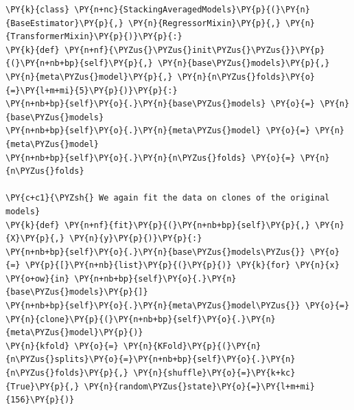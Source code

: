 \documentclass[no-math]{YangThesis}
\begin{document}
\begin{tcolorbox}[breakable, size=fbox, boxrule=1pt, pad at break*=1mm,colback=cellbackground, colframe=cellborder]
	\begin{Verbatim}[commandchars=\\\{\}]
\PY{k}{class} \PY{n+nc}{StackingAveragedModels}\PY{p}{(}\PY{n}{BaseEstimator}\PY{p}{,} \PY{n}{RegressorMixin}\PY{p}{,} \PY{n}{TransformerMixin}\PY{p}{)}\PY{p}{:}
\PY{k}{def} \PY{n+nf}{\PYZus{}\PYZus{}init\PYZus{}\PYZus{}}\PY{p}{(}\PY{n+nb+bp}{self}\PY{p}{,} \PY{n}{base\PYZus{}models}\PY{p}{,} \PY{n}{meta\PYZus{}model}\PY{p}{,} \PY{n}{n\PYZus{}folds}\PY{o}{=}\PY{l+m+mi}{5}\PY{p}{)}\PY{p}{:}
\PY{n+nb+bp}{self}\PY{o}{.}\PY{n}{base\PYZus{}models} \PY{o}{=} \PY{n}{base\PYZus{}models}
\PY{n+nb+bp}{self}\PY{o}{.}\PY{n}{meta\PYZus{}model} \PY{o}{=} \PY{n}{meta\PYZus{}model}
\PY{n+nb+bp}{self}\PY{o}{.}\PY{n}{n\PYZus{}folds} \PY{o}{=} \PY{n}{n\PYZus{}folds}

\PY{c+c1}{\PYZsh{} We again fit the data on clones of the original models}
\PY{k}{def} \PY{n+nf}{fit}\PY{p}{(}\PY{n+nb+bp}{self}\PY{p}{,} \PY{n}{X}\PY{p}{,} \PY{n}{y}\PY{p}{)}\PY{p}{:}
\PY{n+nb+bp}{self}\PY{o}{.}\PY{n}{base\PYZus{}models\PYZus{}} \PY{o}{=} \PY{p}{[}\PY{n+nb}{list}\PY{p}{(}\PY{p}{)} \PY{k}{for} \PY{n}{x} \PY{o+ow}{in} \PY{n+nb+bp}{self}\PY{o}{.}\PY{n}{base\PYZus{}models}\PY{p}{]}
\PY{n+nb+bp}{self}\PY{o}{.}\PY{n}{meta\PYZus{}model\PYZus{}} \PY{o}{=} \PY{n}{clone}\PY{p}{(}\PY{n+nb+bp}{self}\PY{o}{.}\PY{n}{meta\PYZus{}model}\PY{p}{)}
\PY{n}{kfold} \PY{o}{=} \PY{n}{KFold}\PY{p}{(}\PY{n}{n\PYZus{}splits}\PY{o}{=}\PY{n+nb+bp}{self}\PY{o}{.}\PY{n}{n\PYZus{}folds}\PY{p}{,} \PY{n}{shuffle}\PY{o}{=}\PY{k+kc}{True}\PY{p}{,} \PY{n}{random\PYZus{}state}\PY{o}{=}\PY{l+m+mi}{156}\PY{p}{)}


\end{Verbatim}
\end{tcolorbox}
\end{document}
